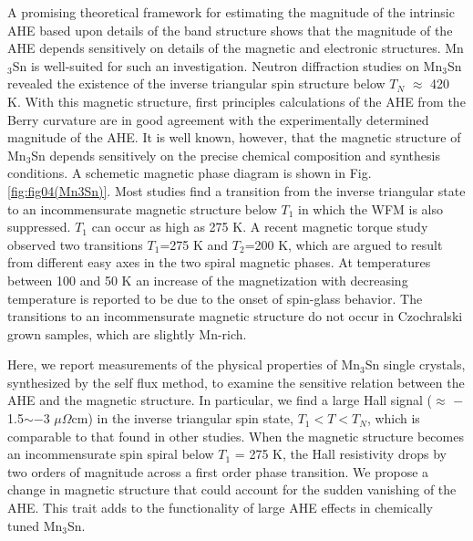 \documentclass[prb,twocolumn,showpacs,preprintnumbers,amsmath,amssymb]{revtex4}
\begin{document}
A promising theoretical framework for estimating the magnitude of the intrinsic AHE based upon details of the band structure shows that the magnitude of the AHE depends sensitively on details of the magnetic and electronic structures.\cite{MacDonald, MTSuzuki_arxiv2016, Sci2001, YoMachida2010, CFelser, BinghaiYan2017, LeonBalents2017}
Mn$_3$Sn is well-suited for such an investigation.  
Neutron diffraction studies on Mn$_3$Sn revealed the existence of the inverse triangular spin structure below $T_N$ $\approx$ 420 K.\cite{TomiyoshiJPSJ, PJBrown} 
With this magnetic structure, first principles calculations of the AHE from the Berry curvature are in good agreement with the experimentally determined magnitude of the AHE.\cite{BinghaiYanPRB95, Zhang} 
It is well known, however, that the magnetic structure of Mn$_3$Sn depends sensitively on the precise chemical composition and synthesis conditions.\cite{1972, 1975} A schemetic magnetic phase diagram is shown in Fig. \ref{fig:fig04(Mn3Sn)}. Most studies find a transition from the inverse triangular state to an incommensurate magnetic structure below $T_1$ in which the WFM is also suppressed. $T_1$ can occur as high as 275 K. 
A recent magnetic torque study observed two transitions $T_1$=275 K and $T_2$=200 K, which are argued to result from different easy axes in the two spiral magnetic phases.\cite{APL2015} 
At temperatures between 100 and 50 K an increase of the magnetization with decreasing temperature is reported to be due to the onset of spin-glass behavior.\cite{PJBrown,JMMM54} 
The transitions to an incommensurate magnetic structure do not occur in Czochralski grown samples, which are slightly Mn-rich.\cite{Nakatsuji2015}

Here, we report measurements of the physical properties of Mn$_3$Sn single crystals, synthesized by the self flux method, to examine the sensitive relation between the AHE and the magnetic structure.  
In particular, we find a large Hall signal ($\approx$ $-$1.5$\sim$$-$3 $\mu \Omega$cm) in the inverse triangular spin state, %
$T_1 < T < T_N$, which is comparable to that found in other studies.\cite{Nakatsuji2015, SParkin2016} 
When the magnetic structure becomes an incommensurate spin spiral below $T_1$ = 275 K, the Hall resistivity drops by two orders of magnitude across a first order phase transition. We propose a change in magnetic structure that could account for the sudden vanishing of the AHE. 
This trait adds to the functionality of large AHE effects in chemically tuned Mn$_3$Sn. 
\end{document}
